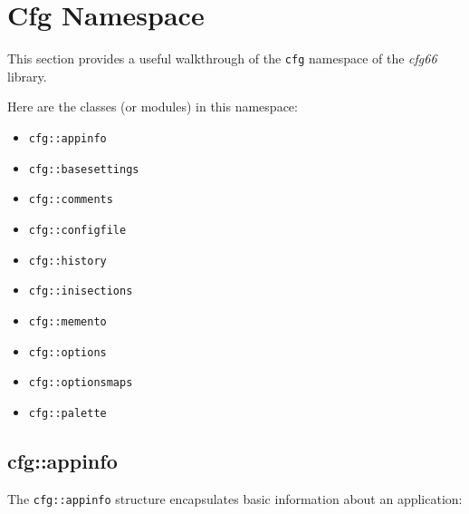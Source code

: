 %
%
%

\section{Cfg Namespace}
\label{sec:cfg_namespace}

   This section provides a useful walkthrough of the \texttt{cfg} namespace of
   the \textsl{cfg66} library.

   Here are the classes (or modules) in this namespace:

   \begin{itemize}
      \item \texttt{cfg::appinfo}
      \item \texttt{cfg::basesettings}
      \item \texttt{cfg::comments}
      \item \texttt{cfg::configfile}
      \item \texttt{cfg::history}
      \item \texttt{cfg::inisections}
      \item \texttt{cfg::memento}
      \item \texttt{cfg::options}
      \item \texttt{cfg::optionsmaps}
      \item \texttt{cfg::palette}
   \end{itemize}

\subsection{cfg::appinfo}
\label{subsec:cfg_namespace_appinfo}

   The \texttt{cfg::appinfo} structure encapsulates basic information about
   an application:

